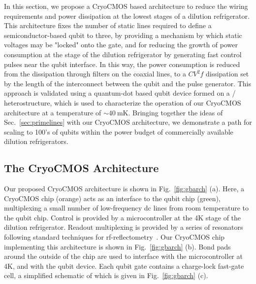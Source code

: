 In this section, we propose a CryoCMOS based architecture to reduce the wiring requirements and power dissipation at the lowest stages of a dilution refrigerator. This architecture
fixes the number of static lines required to define a semiconductor-based qubit to three, by providing a mechanism by which static voltages may be "locked" onto the gate, and for
reducing the growth of power consumption at the \si{\mk} stage of the dilution refrigerator by generating fast control pulses near the qubit interface. In this way, the power
consumption is reduced from the dissipation through filters on the coaxial lines, to a $CV^2f$ dissipation set by the length of the interconnect between the qubit and the pulse
generator. This approach is validated using a quantum-dot based qubit device formed on a / heterostructure, which is used to characterize the operation of
our CryoCMOS architecture at a temperature of $\sim \SI{40}{\milli\kelvin}$. Bringing together the ideas of Sec.~\ref{sec:primelines} with our CryoCMOS architecture, we demonstrate
a path for scaling to 100's of qubits within the power budget of commercially available dilution refrigerators.

\subsection{The CryoCMOS Architecture}
\label{sec:gbarch}

Our proposed CryoCMOS architecture is shown in Fig.~\ref{fig:gbarch} (a). Here, a CryoCMOS chip (orange) acts as an interface to the qubit chip (green), multiplexing a small number
of low-frequency dc lines from room temperature to the qubit chip. Control is provided by a microcontroller at the 4K stage of the dilution refrigerator. Readout multiplexing is provided by a series of resonators~\cite{doi:10.1063/1.4868107} following standard techniques for rf-reflectometry~\cite{Reilly:2007ig,barthel2009rapid}. Our CryoCMOS chip implementing this architecture is shown in Fig.~\ref{fig:gbarch} (b). Bond pads around the outside of the chip are used to interface with the microcontroller at 4K, and with the qubit device. Each qubit gate contains a charge-lock fast-gate cell, a simplified schematic of which is given in Fig.~\ref{fig:gbarch} (c).

